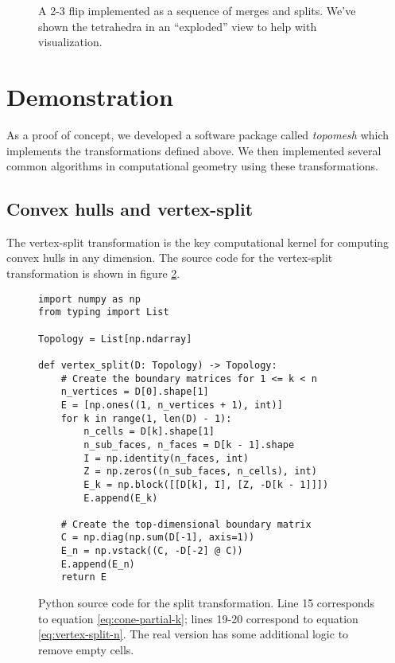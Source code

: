 \documentclass[twocolumn]{article}
\begin{document}
\begin{figure}[h]
    \begin{center}
        
    \end{center}
    \caption{A 2-3 flip implemented as a sequence of merges and splits.
    We've shown the tetrahedra in an ``exploded'' view to help with visualization.}
    \label{fig:2-3-flip}
\end{figure}



\section{Demonstration}

As a proof of concept, we developed a software package called \emph{topomesh} which implements the transformations defined above.
We then implemented several common algorithms in computational geometry using these transformations.

\subsection{Convex hulls and vertex-split}

The vertex-split transformation is the key computational kernel for computing convex hulls in any dimension.
The source code for the vertex-split transformation is shown in figure \ref{fig:split-source-code}.
\begin{figure}
    \begin{verbatim}
import numpy as np
from typing import List

Topology = List[np.ndarray]

def vertex_split(D: Topology) -> Topology:
    # Create the boundary matrices for 1 <= k < n
    n_vertices = D[0].shape[1]
    E = [np.ones((1, n_vertices + 1), int)]
    for k in range(1, len(D) - 1):
        n_cells = D[k].shape[1]
        n_sub_faces, n_faces = D[k - 1].shape
        I = np.identity(n_faces, int)
        Z = np.zeros((n_sub_faces, n_cells), int)
        E_k = np.block([[D[k], I], [Z, -D[k - 1]]])
        E.append(E_k)

    # Create the top-dimensional boundary matrix
    C = np.diag(np.sum(D[-1], axis=1))
    E_n = np.vstack((C, -D[-2] @ C))
    E.append(E_n)
    return E
    \end{verbatim}
    \caption{Python source code for the split transformation.
    Line 15 corresponds to equation \eqref{eq:cone-partial-k}; lines 19-20 correspond to equation \eqref{eq:vertex-split-n}.
    The real version has some additional logic to remove empty cells.}
    \label{fig:split-source-code}
\end{figure}
\end{document}
